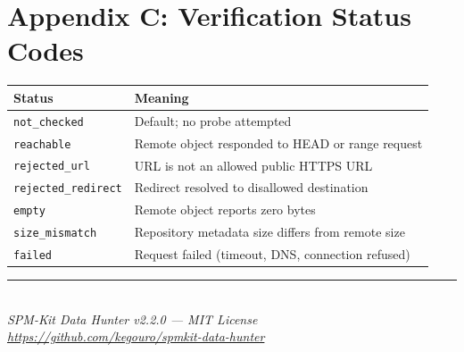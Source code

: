 \documentclass[11pt,a4paper]{article}
\begin{document}
\section*{Appendix C: Verification Status Codes}

\begin{center}
\begin{tabular}{ll}
\toprule
\textbf{Status} & \textbf{Meaning} \\
\midrule
\texttt{not\_checked} & Default; no probe attempted \\
\texttt{reachable} & Remote object responded to HEAD or range request \\
\texttt{rejected\_url} & URL is not an allowed public HTTPS URL \\
\texttt{rejected\_redirect} & Redirect resolved to disallowed destination \\
\texttt{empty} & Remote object reports zero bytes \\
\texttt{size\_mismatch} & Repository metadata size differs from remote size \\
\texttt{failed} & Request failed (timeout, DNS, connection refused) \\
\bottomrule
\end{tabular}
\end{center}

\vspace{16pt}
\begin{center}
\rule{0.4\textwidth}{0.4pt}\\[6pt]
\textit{SPM-Kit Data Hunter v2.2.0 --- MIT License}\\[2pt]
\textit{\url{https://github.com/kegouro/spmkit-data-hunter}}
\end{center}
\end{document}
